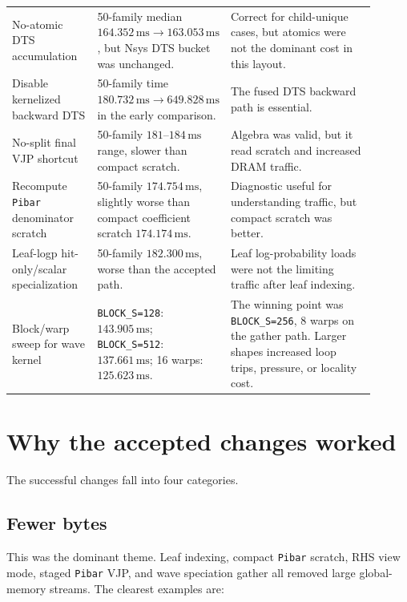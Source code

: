 \documentclass[11pt]{article}
\newcommand{\ms}{\,\mathrm{ms}}
\newcommand{\code}[1]{\texttt{#1}}
\begin{document}
\begin{longtable}{p{0.24\linewidth}p{0.22\linewidth}p{0.44\linewidth}}
No-atomic DTS accumulation & 50-family median $164.352\ms \to 163.053\ms$, but Nsys DTS bucket was unchanged. & Correct for child-unique cases, but atomics were not the dominant cost in this layout. \\

Disable kernelized backward DTS & 50-family time $180.732\ms \to 649.828\ms$ in the early comparison. & The fused DTS backward path is essential. \\

No-split final VJP shortcut & 50-family $181$--$184\ms$ range, slower than compact scratch. & Algebra was valid, but it read scratch and increased DRAM traffic. \\

Recompute \code{Pibar} denominator scratch & 50-family $174.754\ms$, slightly worse than compact coefficient scratch $174.174\ms$. & Diagnostic useful for understanding traffic, but compact scratch was better. \\

Leaf-logp hit-only/scalar specialization & 50-family $182.300\ms$, worse than the accepted path. & Leaf log-probability loads were not the limiting traffic after leaf indexing. \\

Block/warp sweep for wave kernel & \code{BLOCK\_S=128}: $143.905\ms$; \code{BLOCK\_S=512}: $137.661\ms$; 16 warps: $125.623\ms$. & The winning point was \code{BLOCK\_S=256}, 8 warps on the gather path. Larger shapes increased loop trips, pressure, or locality cost. \\

\bottomrule
\end{longtable}

\section{Why the accepted changes worked}

The successful changes fall into four categories.

\subsection{Fewer bytes}

This was the dominant theme.  Leaf indexing, compact \code{Pibar} scratch, RHS
view mode, staged \code{Pibar} VJP, and wave speciation gather all removed large
global-memory streams.  The clearest examples are:
\end{document}

